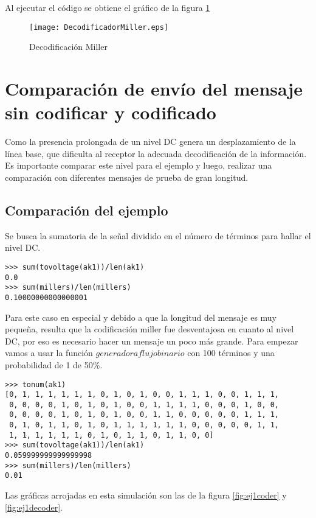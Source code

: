 \documentclass{article}
\begin{document}
 Al ejecutar el código se obtiene el gráfico de la figura \ref{fig:decodificadormiller}

\begin{figure}
  \centering
    \texttt{[image: DecodificadorMiller.eps]}
  \caption{Decodificación Miller}
  \label{fig:decodificadormiller}
\end{figure}

\section {Comparación de envío del mensaje sin codificar y codificado}

Como la presencia prolongada de un nivel DC genera un desplazamiento de la línea base, que dificulta al receptor la adecuada decodificación de la información. Es importante comparar este nivel para el ejemplo y luego, realizar una comparación con diferentes mensajes de prueba de gran longitud.

\subsection {Comparación del ejemplo}

Se busca la sumatoria de la señal dividido en el número de términos para hallar el nivel DC.

\begin{verbatim}
>>> sum(tovoltage(ak1))/len(ak1)
0.0
>>> sum(millers)/len(millers)
0.10000000000000001
\end{verbatim}

Para este caso en especial y debido a que la longitud del mensaje es muy pequeña, resulta que la codificación miller fue desventajosa en cuanto al nivel DC, por eso es necesario hacer un mensaje un poco más grande. Para empezar vamos a usar la función $generadoraflujobinario$ con 100 términos y una probabilidad de 1 de 50\%. 

\begin{verbatim}
>>> tonum(ak1)
[0, 1, 1, 1, 1, 1, 1, 0, 1, 0, 1, 0, 0, 1, 1, 1, 0, 0, 1, 1, 1,
 0, 0, 0, 0, 1, 0, 1, 0, 1, 0, 0, 1, 1, 1, 1, 0, 0, 0, 1, 0, 0,
 0, 0, 0, 0, 1, 0, 1, 0, 1, 0, 0, 1, 1, 0, 0, 0, 0, 0, 1, 1, 1,
 0, 1, 0, 1, 1, 0, 1, 0, 1, 1, 1, 1, 1, 1, 0, 0, 0, 0, 0, 1, 1,
 1, 1, 1, 1, 1, 1, 0, 1, 0, 1, 1, 0, 1, 1, 0, 0]
>>> sum(tovoltage(ak1))/len(ak1)
0.059999999999999998
>>> sum(millers)/len(millers)
0.01
\end{verbatim}

Las gráficas arrojadas en esta simulación son las de la  figura \ref{fig:ej1coder}  y  \ref{fig:ej1decoder}.
\end{document}
